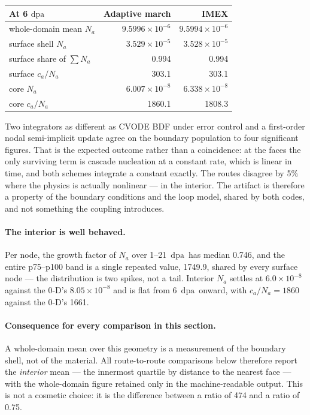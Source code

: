 \documentclass[11pt,a4paper]{article}
\newcommand{\dpa}{\ensuremath{\mathrm{dpa}}}
\begin{document}
\begin{center}
\begin{tabular}{lrr}
\toprule
At 6 \dpa & Adaptive march & IMEX \\
\midrule
whole-domain mean $N_a$  & $9.5996\times10^{-6}$ & $9.5994\times10^{-6}$ \\
surface shell $N_a$      & $3.529\times10^{-5}$  & $3.528\times10^{-5}$ \\
surface share of $\sum N_a$ & 0.994              & 0.994 \\
surface $c_a/N_a$        & 303.1                 & 303.1 \\
\midrule
core $N_a$               & $6.007\times10^{-8}$  & $6.338\times10^{-8}$ \\
core $c_a/N_a$           & 1860.1                & 1808.3 \\
\bottomrule
\end{tabular}
\end{center}

\noindent
Two integrators as different as CVODE BDF under error control and a first-order
nodal semi-implicit update agree on the boundary population to four significant
figures. That is the expected outcome rather than a coincidence: at the faces
the only surviving term is cascade nucleation at a constant rate, which is
linear in time, and both schemes integrate a constant exactly. The routes
disagree by 5\% where the physics is actually nonlinear --- in the interior.
The artifact is therefore a property of the boundary conditions and the loop
model, shared by both codes, and not something the coupling introduces.

\paragraph{The interior is well behaved.} Per node, the growth factor of $N_a$
over 1--21~\dpa\ has median 0.746, and the entire p75--p100 band is a single
repeated value, 1749.9, shared by every surface node --- the distribution is two
spikes, not a tail. Interior $N_a$ settles at $6.0\times10^{-8}$ against the
0-D's $8.05\times10^{-8}$ and is flat from 6~\dpa\ onward, with $c_a/N_a=1860$
against the 0-D's 1661.

\paragraph{Consequence for every comparison in this section.} A whole-domain
mean over this geometry is a measurement of the boundary shell, not of the
material. All route-to-route comparisons below therefore report the
\emph{interior} mean --- the innermost quartile by distance to the nearest
face --- with the whole-domain figure retained only in the machine-readable
output. This is not a cosmetic choice: it is the difference between a ratio of
474 and a ratio of 0.75.
\end{document}
